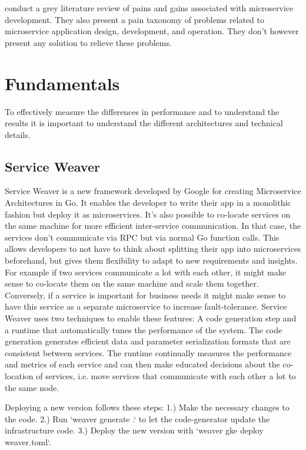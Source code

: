 \documentclass[sigconf,review,9pt]{acmart}
\begin{document}
 conduct a grey literature review of pains and gains
associated with microservice development.
They also present a pain taxonomy of problems related to microservice application
design, development, and operation.
They don't however present any solution to relieve these problems.

\section{Fundamentals}

To effectively measure the differences in performance and to understand the results
it is important to understand the different architectures and technical details.

\subsection{Service Weaver}
Service Weaver is a new framework developed by Google for creating Microservice
Architectures in Go. \cite{serviceWeaverSite}
It enables the developer to write their app in a monolithic fashion but deploy it as microservices.
It's also possible to co-locate services on the same machine for more efficient
inter-service communication.
In that case, the services don't communicate via RPC but via normal Go function calls.
This allows developers to not have to think about splitting their app into microservices
beforehand, but gives them flexibility to adapt to new requirements and insights.
For example if two services communicate a lot with each other, it might make sense
to co-locate them on the same machine and scale them together.
Conversely, if a service is important for business needs it might make sense to
have this service as a separate microservice to increase fault-tolerance.
Service Weaver uses two techniques to enable these features:
A code generation step and a runtime that automatically tunes the performance
of the system.
The code generation generates efficient data and parameter serialization formats
that are consistent between services.
The runtime continually measures the performance and metrics of each service and
can then make educated decisions about the co-location of services, i.e.
move services that communicate with each other a lot to the same node.

Deploying a new version follows these steps:
1.) Make the necessary changes to the code.
2.) Run `weaver generate .` to let the code-generator update the infrastructure code.
3.) Deploy the new version with `weaver gke deploy weaver.toml`.
\end{document}
